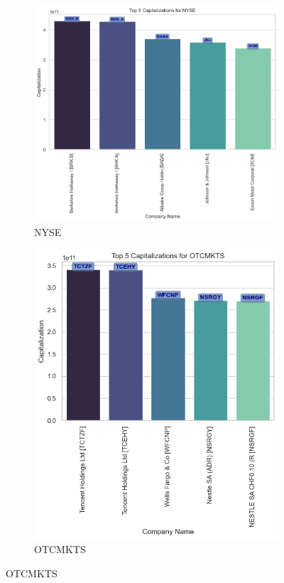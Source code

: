 \documentclass[12pt]{article}
\begin{document}
\begin{figure}[h!]
    \centering
    \begin{subfigure}{.4\textwidth}
        \centering
        \includegraphics[width=.7\textwidth]{P1.5.1.png}
        \caption{NYSE}
        \label{fig:1.5.1}
    \end{subfigure}%
    \begin{subfigure}{.4\textwidth}
        \centering
        \includegraphics[width=.7\textwidth]{P1.5.2.png}
        \caption{OTCMKTS}
        \label{fig:1.5.2}
    \end{subfigure}


\end{figure}
\end{document}
